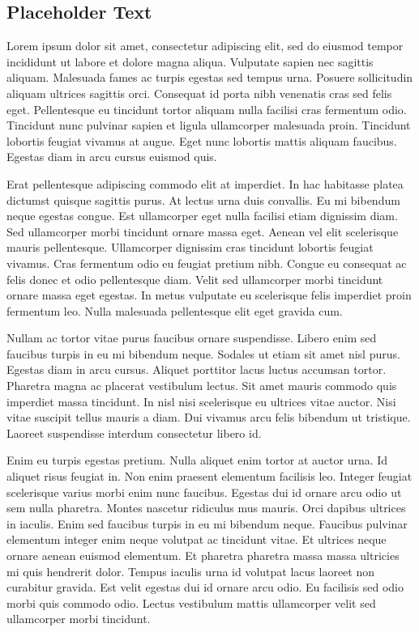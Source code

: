 \documentclass[conference]{IEEEtran}
\begin{document}
\subsection{Placeholder Text}

Lorem ipsum dolor sit amet, consectetur adipiscing elit, sed do eiusmod tempor incididunt ut labore et dolore magna aliqua. Vulputate sapien nec sagittis aliquam. Malesuada fames ac turpis egestas sed tempus urna. Posuere sollicitudin aliquam ultrices sagittis orci. Consequat id porta nibh venenatis cras sed felis eget. Pellentesque eu tincidunt tortor aliquam nulla facilisi cras fermentum odio. Tincidunt nunc pulvinar sapien et ligula ullamcorper malesuada proin. Tincidunt lobortis feugiat vivamus at augue. Eget nunc lobortis mattis aliquam faucibus. Egestas diam in arcu cursus euismod quis.

Erat pellentesque adipiscing commodo elit at imperdiet. In hac habitasse platea dictumst quisque sagittis purus. At lectus urna duis convallis. Eu mi bibendum neque egestas congue. Est ullamcorper eget nulla facilisi etiam dignissim diam. Sed ullamcorper morbi tincidunt ornare massa eget. Aenean vel elit scelerisque mauris pellentesque. Ullamcorper dignissim cras tincidunt lobortis feugiat vivamus. Cras fermentum odio eu feugiat pretium nibh. Congue eu consequat ac felis donec et odio pellentesque diam. Velit sed ullamcorper morbi tincidunt ornare massa eget egestas. In metus vulputate eu scelerisque felis imperdiet proin fermentum leo. Nulla malesuada pellentesque elit eget gravida cum.

Nullam ac tortor vitae purus faucibus ornare suspendisse. Libero enim sed faucibus turpis in eu mi bibendum neque. Sodales ut etiam sit amet nisl purus. Egestas diam in arcu cursus. Aliquet porttitor lacus luctus accumsan tortor. Pharetra magna ac placerat vestibulum lectus. Sit amet mauris commodo quis imperdiet massa tincidunt. In nisl nisi scelerisque eu ultrices vitae auctor. Nisi vitae suscipit tellus mauris a diam. Dui vivamus arcu felis bibendum ut tristique. Laoreet suspendisse interdum consectetur libero id.

Enim eu turpis egestas pretium. Nulla aliquet enim tortor at auctor urna. Id aliquet risus feugiat in. Non enim praesent elementum facilisis leo. Integer feugiat scelerisque varius morbi enim nunc faucibus. Egestas dui id ornare arcu odio ut sem nulla pharetra. Montes nascetur ridiculus mus mauris. Orci dapibus ultrices in iaculis. Enim sed faucibus turpis in eu mi bibendum neque. Faucibus pulvinar elementum integer enim neque volutpat ac tincidunt vitae. Et ultrices neque ornare aenean euismod elementum. Et pharetra pharetra massa massa ultricies mi quis hendrerit dolor. Tempus iaculis urna id volutpat lacus laoreet non curabitur gravida. Est velit egestas dui id ornare arcu odio. Eu facilisis sed odio morbi quis commodo odio. Lectus vestibulum mattis ullamcorper velit sed ullamcorper morbi tincidunt.
\end{document}
